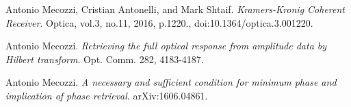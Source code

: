 \begin{thebibliography}{9}
	Antonio Mecozzi, Cristian Antonelli, and Mark Shtaif.
	\textit{Kramers-Kronig Coherent Receiver}.
	Optica, vol.3, no.11, 2016, p.1220., doi:10.1364/optica.3.001220.
	
	Antonio Mecozzi.
	\textit{Retrieving the full optical response from amplitude data by Hilbert transform}. Opt. Comm. 282, 4183-4187.
	
	Antonio Mecozzi.
	\textit{A necessary and sufficient condition for minimum phase and implication of phase retrieval}. arXiv:1606.04861.
\end{thebibliography}










